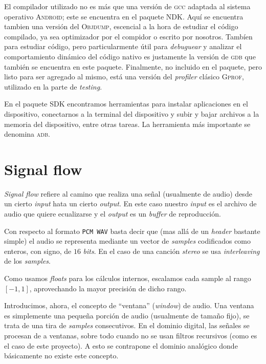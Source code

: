 \documentclass[%
    compressed,
    titlepage,
    narroweqnarray,
    inline,
    twoside,
    ]{ieee}
\begin{document}
El compilador utilizado no es m\'as que una versi\'on de \textsc{gcc} adaptada al sistema operativo \textsc{Android}; este se encuentra en el paquete
\textsc{NDK}. Aqu\'i se encuentra tambien una versi\'on del \textsc{Objdump}, escencial a la hora de estudiar el c\'odigo compilado, ya sea optimizador por
el compidor o escrito por nosotros. Tamb\'ien para estudiar c\'odigo, pero particularmente \'util para \textit{debuguear} y analizar el comportamiento
din\'amico del c\'odigo nativo es justamente la versi\'on de \textsc{gdb} que tambi\'en se encuentra en este paquete.
Finalmente, no incluido en el paquete, pero listo para ser agregado al mismo, est\'a una versi\'on del \textit{profiler} cl\'asico \textsc{Gprof}, utilizado
en la parte de \textit{testing}.

En el paquete \textsc{SDK} encontramos herramientas para instalar aplicaciones en el dispositivo, conectarnos a la terminal del dispositivo y subir y bajar
archivos a la memoria del dispositivo, entre otras tareas. La herramienta m\'as importante se denomina \textsc{adb}.



\section{Signal flow}
\textit{Signal flow} refiere al camino que realiza una se\~nal (usualmente de audio) desde un cierto
\textit{input} hata un cierto \textit{output}. En este caso nuestro \textit{input} es el archivo
de audio que quiere ecualizarse y el \textit{output} es un \textit{buffer} de reproducci\'on.

Con respecto al formato \texttt{PCM WAV} basta decir que (mas all\'a de un \textit{header} bastante simple)
el audio se representa mediante un vector de \textit{samples} codificados como enteros, con signo, de $16$
\textit{bits}. En el caso de una canci\'on \textit{stereo} se usa \textit{interleaving} de los \textit{samples}.

Como usamos \textit{floats} para los c\'alculos internos, escalamos cada sample al rango $[-1,1]$,
aprovechando la mayor precisi\'on de dicho rango.

Introducimos, ahora, el concepto de ``ventana'' (\textit{window}) de audio. Una ventana
es simplemente una peque\~na porci\'on de audio (usualmente de tama\~no fijo), se trata de una tira de \textit{samples}
consecutivos. En el dominio digital, las
se\~nales se procesan de a ventanas, sobre todo cuando no se usan filtros recursivos (como es el caso de
este proyecto). A esto se contrapone el dominio anal\'ogico donde b\'asicamente no existe este concepto.
\end{document}
